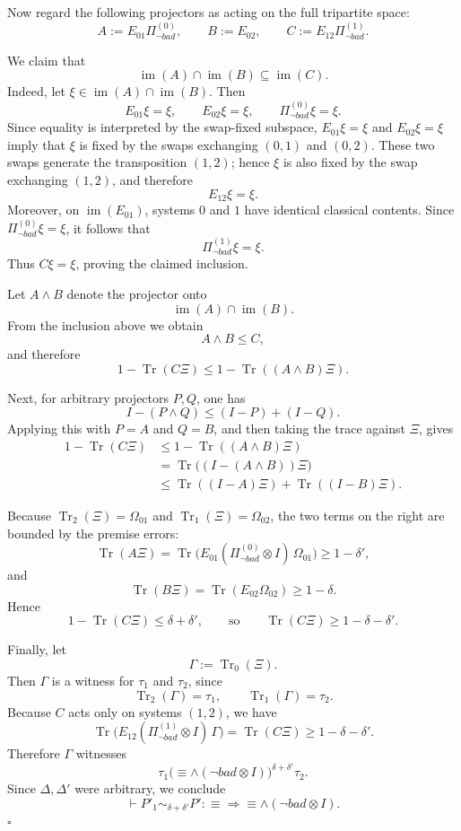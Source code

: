 \documentclass{report}
\theoremstyle{defn_style}
\begin{document}
Now regard the following projectors as acting on the full tripartite space:
\[
A:=E_{01}\Pi_{\neg bad}^{(0)},
\qquad
B:=E_{02},
\qquad
C:=E_{12}\Pi_{\neg bad}^{(1)}.
\]

We claim that
\[
\operatorname{im}(A)\cap\operatorname{im}(B)\subseteq \operatorname{im}(C).
\]
Indeed, let $\xi\in \operatorname{im}(A)\cap\operatorname{im}(B)$.
Then
\[
E_{01}\xi=\xi,
\qquad
E_{02}\xi=\xi,
\qquad
\Pi_{\neg bad}^{(0)}\xi=\xi.
\]
Since equality is interpreted by the swap-fixed subspace, $E_{01}\xi=\xi$ and
$E_{02}\xi=\xi$ imply that $\xi$ is fixed by the swaps exchanging $(0,1)$ and
$(0,2)$. These two swaps generate the transposition $(1,2)$; hence $\xi$ is
also fixed by the swap exchanging $(1,2)$, and therefore
\[
E_{12}\xi=\xi.
\]
Moreover, on $\operatorname{im}(E_{01})$, systems $0$ and $1$ have identical
classical contents. Since $\Pi_{\neg bad}^{(0)}\xi=\xi$, it follows that
\[
\Pi_{\neg bad}^{(1)}\xi=\xi.
\]
Thus $C\xi=\xi$, proving the claimed inclusion.

Let $A\wedge B$ denote the projector onto
\[
\operatorname{im}(A)\cap\operatorname{im}(B).
\]
From the inclusion above we obtain
\[
A\wedge B \le C,
\]
and therefore
\[
1-\operatorname{Tr}(C\Xi)\le 1-\operatorname{Tr}((A\wedge B)\Xi).
\]

Next, for arbitrary projectors $P,Q$, one has
\[
I-(P\wedge Q)\le (I-P)+(I-Q).
\]
Applying this with $P=A$ and $Q=B$, and then taking the trace against $\Xi$,
gives
\begin{align*}
1-\operatorname{Tr}(C\Xi)
&\le 1-\operatorname{Tr}((A\wedge B)\Xi) \\
&= \operatorname{Tr}\bigl((I-(A\wedge B))\Xi\bigr) \\
&\le \operatorname{Tr}((I-A)\Xi)+\operatorname{Tr}((I-B)\Xi).
\end{align*}

Because $\operatorname{Tr}_2(\Xi)=\Omega_{01}$ and $\operatorname{Tr}_1(\Xi)=\Omega_{02}$,
the two terms on the right are bounded by the premise errors:
\[
\operatorname{Tr}(A\Xi)
=
\operatorname{Tr}\bigl(E_{01}(\Pi_{\neg bad}^{(0)}\otimes I)\,\Omega_{01}\bigr)
\ge 1-\delta',
\]
and
\[
\operatorname{Tr}(B\Xi)
=
\operatorname{Tr}(E_{02}\Omega_{02})
\ge 1-\delta.
\]
Hence
\[
1-\operatorname{Tr}(C\Xi)\le \delta+\delta',
\qquad\text{so}\qquad
\operatorname{Tr}(C\Xi)\ge 1-\delta-\delta'.
\]

Finally, let
\[
\Gamma:=\operatorname{Tr}_0(\Xi).
\]
Then $\Gamma$ is a witness for $\tau_1$ and $\tau_2$, since
\[
\operatorname{Tr}_2(\Gamma)=\tau_1,
\qquad
\operatorname{Tr}_1(\Gamma)=\tau_2.
\]
Because $C$ acts only on systems $(1,2)$, we have
\[
\operatorname{Tr}\bigl(E_{12}(\Pi_{\neg bad}^{(1)}\otimes I)\,\Gamma\bigr)
=
\operatorname{Tr}(C\Xi)
\ge 1-\delta-\delta'.
\]
Therefore $\Gamma$ witnesses
\[
\tau_1 \mathrel{\bigl(\equiv \wedge (\neg bad\otimes I)\bigr)^{\delta+\delta'}} \tau_2.
\]
Since $\Delta,\Delta'$ were arbitrary, we conclude
\[
\vdash P'_1 \sim_{\delta+\delta'} P' : \equiv \Longrightarrow \equiv \wedge (\neg bad \otimes I).
\]
\hfill$\square$
\end{document}
